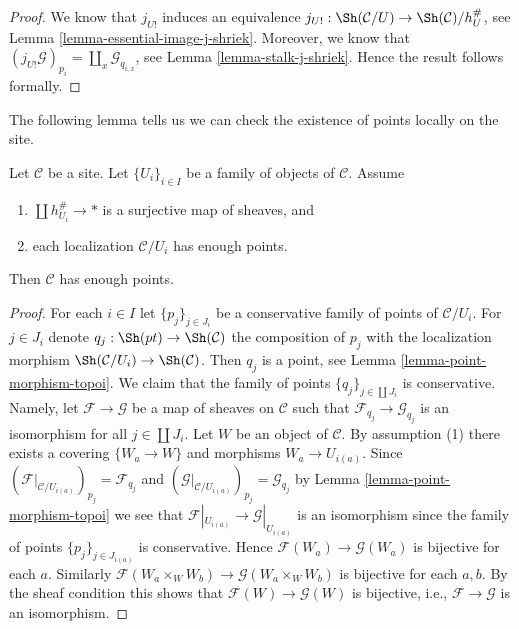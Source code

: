 \begin{proof}
We know that $j_{U!}$ induces an equivalence
$j_{U!} : \Sh(\mathcal{C}/U) \to \Sh(\mathcal{C})/h_U^\#$, see
Lemma \ref{lemma-essential-image-j-shriek}.
Moreover, we know that
$(j_{U!}\mathcal{G})_{p_i} = \coprod_x \mathcal{G}_{q_{i, x}}$, see
Lemma \ref{lemma-stalk-j-shriek}.
Hence the result follows formally.
\end{proof}

\noindent
The following lemma tells us we can check the existence of points
locally on the site.

\begin{lemma}
\label{lemma-enough-points-local}
Let $\mathcal{C}$ be a site. Let $\{U_i\}_{i \in I}$ be a family of
objects of $\mathcal{C}$. Assume
\begin{enumerate}
\item $\coprod h_{U_i}^\# \to *$ is a surjective map of sheaves, and
\item each localization $\mathcal{C}/U_i$ has enough points.
\end{enumerate}
Then $\mathcal{C}$ has enough points.
\end{lemma}

\begin{proof}
For each $i \in I$ let $\{p_j\}_{j \in J_i}$ be a conservative
family of points of $\mathcal{C}/U_i$. For $j \in J_i$ denote
$q_j : \Sh(pt) \to \Sh(\mathcal{C})$ the composition
of $p_j$ with the localization morphism
$\Sh(\mathcal{C}/U_i) \to \Sh(\mathcal{C})$.
Then $q_j$ is a point, see
Lemma \ref{lemma-point-morphism-topoi}.
We claim that the family of points $\{q_j\}_{j \in \coprod J_i}$
is conservative.
Namely, let $\mathcal{F} \to \mathcal{G}$ be a map of sheaves
on $\mathcal{C}$ such that $\mathcal{F}_{q_j} \to \mathcal{G}_{q_j}$
is an isomorphism for all $j \in \coprod J_i$.
Let $W$ be an object of $\mathcal{C}$.
By assumption (1) there exists a covering $\{W_a \to W\}$ and
morphisms $W_a \to U_{i(a)}$.
Since $(\mathcal{F}|_{\mathcal{C}/U_{i(a)}})_{p_j} = \mathcal{F}_{q_j}$
and $(\mathcal{G}|_{\mathcal{C}/U_{i(a)}})_{p_j} = \mathcal{G}_{q_j}$ by
Lemma \ref{lemma-point-morphism-topoi}
we see that
$\mathcal{F}|_{U_{i(a)}} \to \mathcal{G}|_{U_{i(a)}}$ is an isomorphism
since the family of points $\{p_j\}_{j \in J_{i(a)}}$ is conservative.
Hence $\mathcal{F}(W_a) \to \mathcal{G}(W_a)$ is bijective for each $a$.
Similarly $\mathcal{F}(W_a \times_W W_b) \to \mathcal{G}(W_a \times_W W_b)$
is bijective for each $a, b$.
By the sheaf condition this shows that
$\mathcal{F}(W) \to \mathcal{G}(W)$ is bijective, i.e.,
$\mathcal{F} \to \mathcal{G}$ is an isomorphism.
\end{proof}





